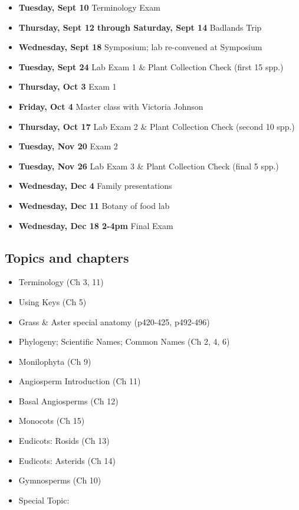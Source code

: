 \documentclass{tufte-handout}
\begin{document}
\begin{fullwidth}
\begin{itemize}
	\item \textbf{Tuesday, Sept 10} Terminology Exam
	\item \textbf{Thursday, Sept 12 through Saturday, Sept 14} Badlands Trip
	\item \textbf{Wednesday, Sept 18} Symposium; lab re-convened at Symposium
	\item \textbf{Tuesday, Sept 24} Lab Exam 1 \& Plant Collection Check (first 15 spp.)
	\item \textbf{Thursday, Oct 3} Exam 1
	\item \textbf{Friday, Oct 4} Master class with Victoria Johnson
	\item \textbf{Thursday, Oct 17} Lab Exam 2 \& Plant Collection Check (second 10 spp.)
	\item \textbf{Tuesday, Nov 20} Exam 2
	\item \textbf{Tuesday, Nov 26} Lab Exam 3 \& Plant Collection Check (final 5 spp.)
	\item \textbf{Wednesday, Dec 4} Family presentations
	\item \textbf{Wednesday, Dec 11} Botany of food lab
	\item \textbf{Wednesday, Dec 18 2-4pm} Final Exam
\end{itemize}

\subsection{Topics and chapters}

\begin{itemize}
	\item Terminology (Ch 3, 11)
	\item Using Keys (Ch 5)
	\item Grass \& Aster special anatomy (p420-425, p492-496)
	\item Phylogeny; Scientific Names; Common Names (Ch 2, 4, 6)
	\item Monilophyta (Ch 9)
	\item Angiosperm Introduction (Ch 11)
	\item Basal Angiosperms (Ch 12)
	\item Monocots (Ch 15)
	\item Eudicots: Rosids (Ch 13)
	\item Eudicots: Asterids (Ch 14)
	\item Gymnosperms (Ch 10)
	\item Special Topic: 
\end{itemize}


\end{fullwidth}
\end{document}
